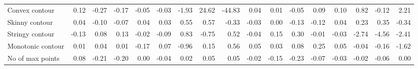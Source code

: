\documentclass{article}
\begin{document}
\begin{table}[!ht]
{\begin{tabular}{lrrrrrrrrrrrrrrrr}
Convex contour                                                          & 0.12                     & -0.27                    & -0.17                    & -0.05                    & -0.03                    & -1.93                    & 24.62                    & -44.83                   & 0.04                     & 0.01                     & -0.05                    & 0.09                     & 0.10                     & 0.82                     & -0.12                    & 2.21                     \\
Skinny contour                                                          & 0.04                     & -0.10                    & -0.07                    & 0.04                     & 0.03                     & 0.55                     & 0.57                     & -0.33                    & -0.03                    & 0.00                     & -0.13                    & -0.12                    & 0.04                     & 0.23                     & 0.35                     & -0.34                    \\
Stringy contour                                                         & -0.13                    & 0.08                     & 0.13                     & -0.02                    & -0.09                    & 0.83                     & -0.75                    & 0.52                     & -0.04                    & 0.15                     & 0.30                     & -0.01                    & -0.03                    & -2.74                    & -4.56                    & -2.41                    \\
Monotonic contour                                                       & 0.01                     & 0.04                     & 0.01                     & -0.17                    & 0.07                     & -0.96                    & 0.15                     & 0.56                     & 0.05                     & 0.03                     & 0.08                     & 0.25                     & 0.05                     & -0.04                    & -0.16                    & -1.62                    \\
No of max points                                                        & 0.08                     & -0.21                    & -0.20                    & 0.00                     & -0.04                    & 0.02                     & 0.05                     & 0.05                     & -0.02                    & -0.15                    & -0.23                    & -0.07                    & -0.03                    & -0.02                    & -0.06                    & 0.00                     \\

\end{tabular}}
\end{table}
\end{document}
